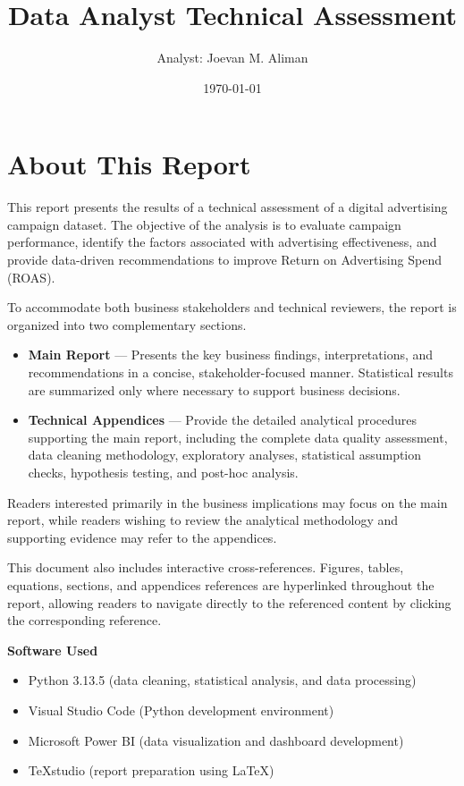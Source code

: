 \documentclass[11pt]{book}
\title{Data Analyst Technical Assessment}
\author{Analyst: Joevan M. Aliman}
\date{\today}
\begin{document}
	
	\maketitle
	\tableofcontents
	
\chapter*{About This Report}

This report presents the results of a technical assessment of a digital advertising campaign dataset. The objective of the analysis is to evaluate campaign performance, identify the factors associated with advertising effectiveness, and provide data-driven recommendations to improve Return on Advertising Spend (ROAS).

To accommodate both business stakeholders and technical reviewers, the report is organized into two complementary sections.

\begin{itemize}
	\item \textbf{Main Report} — Presents the key business findings, interpretations, and recommendations in a concise, stakeholder-focused manner. Statistical results are summarized only where necessary to support business decisions.
	
	\item \textbf{Technical Appendices} — Provide the detailed analytical procedures supporting the main report, including the complete data quality assessment, data cleaning methodology, exploratory analyses, statistical assumption checks, hypothesis testing, and post-hoc analysis.
\end{itemize}

Readers interested primarily in the business implications may focus on the main report, while readers wishing to review the analytical methodology and supporting evidence may refer to the appendices.

This document also includes interactive cross-references. Figures, tables, equations, sections, and appendices references are hyperlinked throughout the report, allowing readers to navigate directly to the referenced content by clicking the corresponding reference.

\vspace{0.5cm}

\textbf{Software Used}

\begin{itemize}
	\item Python 3.13.5 (data cleaning, statistical analysis, and data processing)
	\item Visual Studio Code (Python development environment)
	\item Microsoft Power BI (data visualization and dashboard development)
	\item TeXstudio (report preparation using \LaTeX)
\end{itemize}
\renewcommand{\chaptername}{Task}


\end{document}
